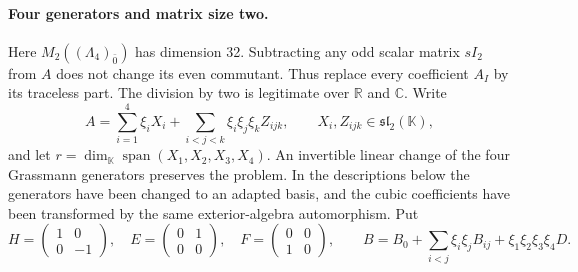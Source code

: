 \paragraph{Four generators and matrix size two.}
Here \(M_2((\Lambda_4)_{\bar0})\) has dimension 32. Subtracting any odd scalar matrix \(sI_2\) from \(A\) does not change its even commutant. Thus replace every coefficient \(A_I\) by its traceless part. The division by two is legitimate over \(\mathbb R\) and \(\mathbb C\). Write
\[
 A=\sum_{i=1}^4\xi_i X_i+\sum_{i<j<k}\xi_i\xi_j\xi_k Z_{ijk},
 \qquad X_i,Z_{ijk}\in\mathfrak{sl}_2(\mathbb K),
\]
and let \(r=\dim_{\mathbb K}\operatorname{span}(X_1,X_2,X_3,X_4)\). An invertible linear change of the four Grassmann generators preserves the problem. In the descriptions below the generators have been changed to an adapted basis, and the cubic coefficients have been transformed by the same exterior-algebra automorphism. Put
\[
 H=\begin{pmatrix}1&0\\0&-1\end{pmatrix},\quad
 E=\begin{pmatrix}0&1\\0&0\end{pmatrix},\quad
 F=\begin{pmatrix}0&0\\1&0\end{pmatrix},\qquad
 B=B_0+\sum_{i<j}\xi_i\xi_jB_{ij}+\xi_1\xi_2\xi_3\xi_4D.
\]

